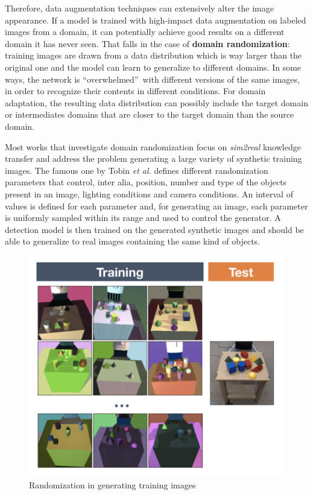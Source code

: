 \documentclass[%
    corpo=12pt,
    twoside,
    stile=classica,   
    tipotesi=magistrale,
    evenboxes,
    english,
	numerazioneromana,
]{toptesi}
\begin{document}
Therefore, data augmentation techniques can extensively alter the image appearance. If a model is trained with high-impact data augmentation on labeled images from a domain, it can potentially achieve good results on a different domain it has never seen. That falls in the case of \textbf{domain randomization}: training images are drawn from a data distribution which is way larger than the original one and the model can learn to generalize to different domains. In some ways, the network is \textquotedblleft overwhelmed\textquotedblright~with different versions of the same images, in order to recognize their contents in different conditions. For domain adaptation, the resulting data distribution can possibly include the target domain or intermediates domains that are closer to the target domain than the source domain.

Most works that investigate domain randomization focus on \textit{sim2real} knowledge transfer and address the problem generating a large variety of synthetic training images. The famous one by Tobin \textit{et al.}\cite{tobin2017domain} defines different randomization parameters that control, inter alia, position, number and type of the objects present in an image, lighting conditions and camera conditions. An interval of values is defined for each parameter and, for generating an image, each parameter is uniformly sampled within its range and used to control the generator. A detection model is then trained on the generated synthetic images and should be able to generalize to real images containing the same kind of objects.

\begin{figure}[ht!]
	\centering
	\includegraphics[width=0.6\linewidth]{imgs/randomization.png}
	\caption{Randomization in generating training images\cite{tobin2017domain}}
	\label{fig:randomization}
\end{figure}
\end{document}
